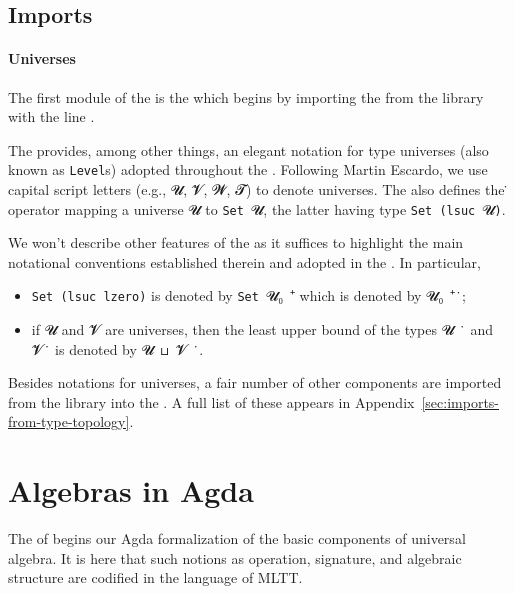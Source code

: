 \documentclass[a4paper,USenglish,cleveref,autoref,thm-restate]{lipics-v2019}
\begin{document}
\subsection{Imports}\label{imports}
\paragraph*{Universes}
The first module of the \agdaualib is the \preludemodule which begins by importing the \universesmodule from the \typetopology library with the line \AgdaSpace{}\AgdaSpace{}\AgdaSpace{}.

The \universesmodule provides, among other things, an elegant notation for type universes (also known as \texttt{Level}s) adopted throughout the \agdaualib.
Following Martin Escardo, we use capital script letters (e.g., \ab 𝓤, \ab 𝓥, \ab 𝓦, \ab 𝓣) to denote universes. The \universesmodule also defines the ̇ operator mapping a universe \ab 𝓤 to \texttt{Set}\ \ab 𝓤, the latter having type \texttt{Set (lsuc}\ \ab 𝓤\texttt{)}.

We won't describe other features of the \universesmodule as it suffices to highlight the main notational conventions established therein and adopted in the \agdaualib. In particular,
\begin{itemize}
  \item \texttt{Set\ (lsuc\ lzero)} is denoted by \texttt{Set}\ \ab 𝓤₀\ ⁺ which is denoted by \ab 𝓤₀\ ⁺\ ̇;
  \item if \ab 𝓤 and \ab 𝓥 are universes, then the least upper bound of the types \ab 𝓤~ ̇ and \ab 𝓥\ ̇ is denoted by \ab 𝓤~⊔~\ab 𝓥~ ̇.
\end{itemize}

Besides notations for universes, a fair number of other components are imported from the \typetopology library into the \agdaualib. A full list of these appears in Appendix~\ref{sec:imports-from-type-topology}.

\section{Algebras in Agda}\label{sec:algebras-in-agda}
The \basicmodule of \agdaualib begins our Agda formalization of the basic components of universal algebra. It is here that such notions as operation, signature, and algebraic structure are codified in the language of MLTT.
\end{document}

